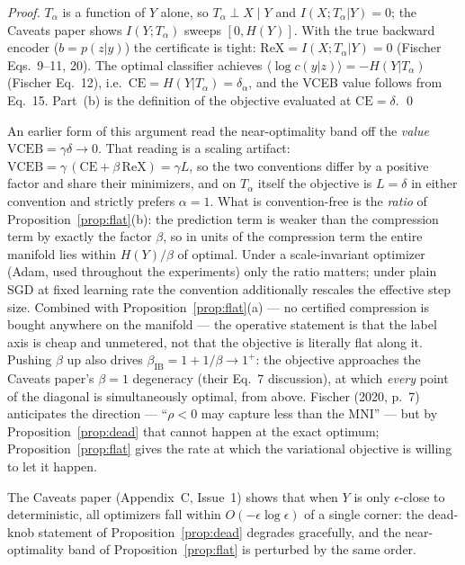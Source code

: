 \begin{proof}
$T_\alpha$ is a function of $Y$ alone, so $T_\alpha \perp X \mid Y$ and
$I(X;T_\alpha|Y) = 0$; the Caveats paper shows $I(Y;T_\alpha)$ sweeps $[0, H(Y)]$.
With the true backward encoder ($b = p(z|y)$) the certificate is tight:
$\mathrm{ReX} = I(X;T_\alpha|Y) = 0$ (Fischer Eqs.~9--11, 20). The optimal classifier
achieves $\langle \log c(y|z)\rangle = -H(Y|T_\alpha)$ (Fischer Eq.~12), i.e.\
$\mathrm{CE} = H(Y|T_\alpha) = \delta_\alpha$, and the VCEB value follows from Eq.~15.
Part~(b) is the definition of the objective evaluated at $\mathrm{CE} = \delta$.
\hfill\qed
\end{proof}

\begin{remark}\label{rem:convention}
An earlier form of this argument read the near-optimality band off the \emph{value}
$\mathrm{VCEB} = \gamma\delta \to 0$. That reading is a scaling artifact:
$\mathrm{VCEB} = \gamma\,(\mathrm{CE} + \beta\,\mathrm{ReX}) = \gamma L$, so the two
conventions differ by a positive factor and share their minimizers, and on $T_\alpha$ itself
the objective is $L = \delta$ in either convention and strictly prefers $\alpha = 1$. What
is convention-free is the \emph{ratio} of Proposition~\ref{prop:flat}(b): the prediction
term is weaker than the compression term by exactly the factor $\beta$, so in units of the
compression term the entire manifold lies within $H(Y)/\beta$ of optimal. Under a
scale-invariant optimizer (Adam, used throughout the experiments) only the ratio matters;
under plain SGD at fixed learning rate the convention additionally rescales the effective
step size. Combined with Proposition~\ref{prop:flat}(a) --- no certified compression is
bought anywhere on the manifold --- the operative statement is that the label axis is cheap
and unmetered, not that the objective is literally flat along it.
Pushing $\beta$ up also drives $\beta_{\mathrm{IB}} = 1 + 1/\beta \to 1^{+}$: the objective
approaches the Caveats paper's $\beta = 1$ degeneracy (their Eq.~7 discussion), at which
\emph{every} point of the diagonal is simultaneously optimal, from above. Fischer (2020,
p.~7) anticipates the direction --- ``$\rho < 0$ may capture less than the MNI'' --- but by
Proposition~\ref{prop:dead} that cannot happen at the exact optimum;
Proposition~\ref{prop:flat} gives the rate at which the variational objective is willing to
let it happen.
\end{remark}

\begin{remark}\label{rem:approx}
The Caveats paper (Appendix~C, Issue~1) shows that when $Y$ is only $\epsilon$-close to
deterministic, all optimizers fall within $O(-\epsilon\log\epsilon)$ of a single corner:
the dead-knob statement of Proposition~\ref{prop:dead} degrades gracefully, and the
near-optimality band of Proposition~\ref{prop:flat} is perturbed by the same order.
\end{remark}

